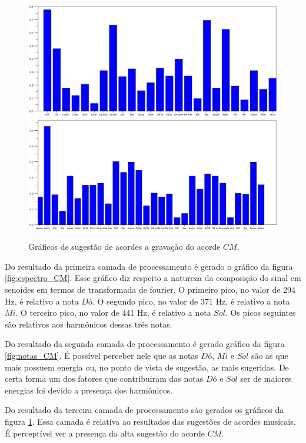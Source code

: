 \begin{figure}[h]
	\centering
		\includegraphics[keepaspectratio=true,scale=0.45]{figuras/CM/acordes_1_cm.eps}
		\includegraphics[keepaspectratio=true,scale=0.45]{figuras/CM/acordes_2_cm.eps}
	\caption{Gráficos de sugestão de acordes a gravação do acorde $CM$.}
  \label{fig:acordes_CM}
\end{figure}

Do resultado da primeira camada de processamento é gerado o gráfico da figura \ref{fig:espectro_CM}. Esse gráfico diz respeito a natureza da composição do sinal em senoides em termos de transformada de fourier. O primeiro pico, no valor de 294 Hz, é relativo a nota $Dó$. O segundo pico, no valor de 371 Hz, é relativo a nota $Mi$. O terceiro pico, no valor de 441 Hz, é relativo a nota $Sol$. Os picos seguintes são relativos aos harmônicos dessas três notas.

Do resultado da segunda camada de processamento é gerado gráfico da figura \ref{fig:notas_CM}. É possível perceber nele que as notas $Dó$, $Mi$ e $Sol$ são as que mais possuem energia ou, no ponto de vista de sugestão, as mais sugeridas. De certa forma um dos fatores que contribuiram das notas $Dó$ e $Sol$ ser de maiores energias foi devido a presença dos harmônicos.

Do resultado da terceira camada de processamento são gerados os gráficos da figura \ref{fig:acordes_CM}. Essa camada é relativa ao resultados das sugestões de acordes musicais. É perceptível ver a presença da alta sugestão do acorde $CM$.


